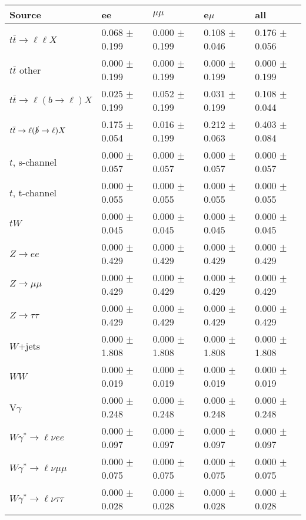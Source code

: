 \begin{tabular}{l | l l l l}
\hline\hline
 Source  &  ee  &  $\mu\mu$  &  e$\mu$  &  all \\
\hline
$t\overline{t}\rightarrow \ell\ell X$ &  0.068 $\pm$  0.199 &  0.000 $\pm$  0.199 &  0.108 $\pm$  0.046 &  0.176 $\pm$  0.056\\
$t\overline{t}$ other &  0.000 $\pm$  0.199 &  0.000 $\pm$  0.199 &  0.000 $\pm$  0.199 &  0.000 $\pm$  0.199\\
$t\overline{t}\rightarrow \ell(b\rightarrow \ell)X$ &  0.025 $\pm$  0.199 &  0.052 $\pm$  0.199 &  0.031 $\pm$  0.199 &  0.108 $\pm$  0.044\\
$t\overline{t}\rightarrow \ell(\slashed{b}\rightarrow \ell)X$ &  0.175 $\pm$  0.054 &  0.016 $\pm$  0.199 &  0.212 $\pm$  0.063 &  0.403 $\pm$  0.084\\
\hline
$t$, s-channel &  0.000 $\pm$  0.057 &  0.000 $\pm$  0.057 &  0.000 $\pm$  0.057 &  0.000 $\pm$  0.057\\
$t$, t-channel &  0.000 $\pm$  0.055 &  0.000 $\pm$  0.055 &  0.000 $\pm$  0.055 &  0.000 $\pm$  0.055\\
$tW$ &  0.000 $\pm$  0.045 &  0.000 $\pm$  0.045 &  0.000 $\pm$  0.045 &  0.000 $\pm$  0.045\\
\hline
$Z\rightarrow ee$ &  0.000 $\pm$  0.429 &  0.000 $\pm$  0.429 &  0.000 $\pm$  0.429 &  0.000 $\pm$  0.429\\
$Z\rightarrow\mu\mu$ &  0.000 $\pm$  0.429 &  0.000 $\pm$  0.429 &  0.000 $\pm$  0.429 &  0.000 $\pm$  0.429\\
$Z\rightarrow\tau\tau$ &  0.000 $\pm$  0.429 &  0.000 $\pm$  0.429 &  0.000 $\pm$  0.429 &  0.000 $\pm$  0.429\\
$W$+jets &  0.000 $\pm$  1.808 &  0.000 $\pm$  1.808 &  0.000 $\pm$  1.808 &  0.000 $\pm$  1.808\\
$WW$ &  0.000 $\pm$  0.019 &  0.000 $\pm$  0.019 &  0.000 $\pm$  0.019 &  0.000 $\pm$  0.019\\
\hline
V$\gamma$ &  0.000 $\pm$  0.248 &  0.000 $\pm$  0.248 &  0.000 $\pm$  0.248 &  0.000 $\pm$  0.248\\
$W\gamma^{*}\rightarrow\ell\nu e e$ &  0.000 $\pm$  0.097 &  0.000 $\pm$  0.097 &  0.000 $\pm$  0.097 &  0.000 $\pm$  0.097\\
$W\gamma^{*}\rightarrow\ell\nu\mu\mu$ &  0.000 $\pm$  0.075 &  0.000 $\pm$  0.075 &  0.000 $\pm$  0.075 &  0.000 $\pm$  0.075\\
$W\gamma^{*}\rightarrow\ell\nu\tau\tau$ &  0.000 $\pm$  0.028 &  0.000 $\pm$  0.028 &  0.000 $\pm$  0.028 &  0.000 $\pm$  0.028\\

\end{tabular}
